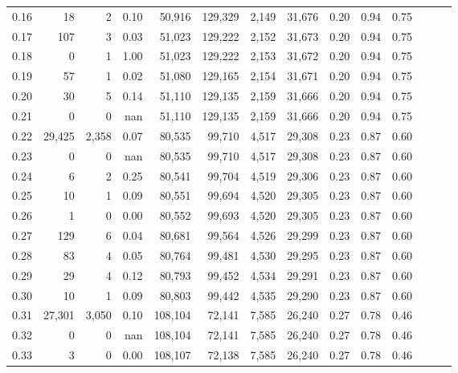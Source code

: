 \begin{tabular}{rrrrrrrrrrrrrr}
0.16 &      18 &      2 &  0.10 &   50,916 &  129,329 &   2,149 &  31,676 &  0.20 &  0.94 &      0.75 \\
0.17 &     107 &      3 &  0.03 &   51,023 &  129,222 &   2,152 &  31,673 &  0.20 &  0.94 &      0.75 \\
0.18 &       0 &      1 &  1.00 &   51,023 &  129,222 &   2,153 &  31,672 &  0.20 &  0.94 &      0.75 \\
0.19 &      57 &      1 &  0.02 &   51,080 &  129,165 &   2,154 &  31,671 &  0.20 &  0.94 &      0.75 \\
0.20 &      30 &      5 &  0.14 &   51,110 &  129,135 &   2,159 &  31,666 &  0.20 &  0.94 &      0.75 \\
0.21 &       0 &      0 &   nan &   51,110 &  129,135 &   2,159 &  31,666 &  0.20 &  0.94 &      0.75 \\
0.22 &  29,425 &  2,358 &  0.07 &   80,535 &   99,710 &   4,517 &  29,308 &  0.23 &  0.87 &      0.60 \\
0.23 &       0 &      0 &   nan &   80,535 &   99,710 &   4,517 &  29,308 &  0.23 &  0.87 &      0.60 \\
0.24 &       6 &      2 &  0.25 &   80,541 &   99,704 &   4,519 &  29,306 &  0.23 &  0.87 &      0.60 \\
0.25 &      10 &      1 &  0.09 &   80,551 &   99,694 &   4,520 &  29,305 &  0.23 &  0.87 &      0.60 \\
0.26 &       1 &      0 &  0.00 &   80,552 &   99,693 &   4,520 &  29,305 &  0.23 &  0.87 &      0.60 \\
0.27 &     129 &      6 &  0.04 &   80,681 &   99,564 &   4,526 &  29,299 &  0.23 &  0.87 &      0.60 \\
0.28 &      83 &      4 &  0.05 &   80,764 &   99,481 &   4,530 &  29,295 &  0.23 &  0.87 &      0.60 \\
0.29 &      29 &      4 &  0.12 &   80,793 &   99,452 &   4,534 &  29,291 &  0.23 &  0.87 &      0.60 \\
0.30 &      10 &      1 &  0.09 &   80,803 &   99,442 &   4,535 &  29,290 &  0.23 &  0.87 &      0.60 \\
0.31 &  27,301 &  3,050 &  0.10 &  108,104 &   72,141 &   7,585 &  26,240 &  0.27 &  0.78 &      0.46 \\
0.32 &       0 &      0 &   nan &  108,104 &   72,141 &   7,585 &  26,240 &  0.27 &  0.78 &      0.46 \\
0.33 &       3 &      0 &  0.00 &  108,107 &   72,138 &   7,585 &  26,240 &  0.27 &  0.78 &      0.46 \\

\end{tabular}
